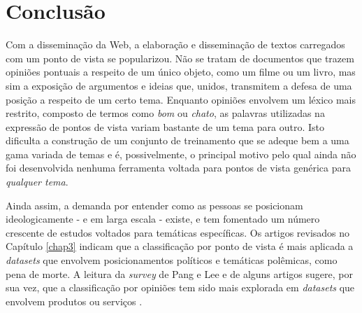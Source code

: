 \chapter{Conclusão}
\label{conclusoes}

Com a disseminação da Web, a elaboração e disseminação de textos carregados com um ponto de vista se popularizou. Não se tratam de documentos que trazem opiniões pontuais a respeito de um único objeto, como um filme ou um livro, mas sim a exposição de argumentos e ideias que, unidos, transmitem a defesa de uma posição a respeito de um certo tema. Enquanto opiniões envolvem um léxico mais restrito, composto de termos como \emph{bom} ou \emph{chato}, as palavras utilizadas na expressão de pontos de vista variam bastante de um tema para outro. Isto dificulta a construção de um conjunto de treinamento que se adeque bem a uma gama variada de temas e é, possivelmente, o principal motivo pelo qual ainda não foi desenvolvida nenhuma ferramenta voltada para pontos de vista genérica para \emph{qualquer tema}. 

Ainda assim, a demanda por entender como as pessoas se posicionam ideologicamente - e em larga escala - existe, e tem fomentado um número crescente de estudos voltados para temáticas específicas. Os artigos revisados no Capítulo \ref{chap3} indicam que a classificação por ponto de vista é mais aplicada a \emph{datasets} que envolvem posicionamentos políticos e temáticas polêmicas, como pena de morte. A leitura da \emph{survey} de Pang e Lee e de alguns artigos sugere, por sua vez, que a classificação por opiniões tem sido mais explorada em \emph{datasets} que envolvem produtos ou serviços \cite{omsa, thumbs-up, peanut-gallery}.


